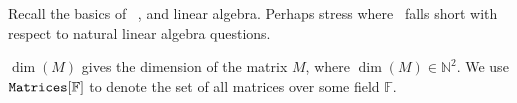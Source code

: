 Recall the basics of \lang\ \cite{matlang}, and linear algebra. Perhaps stress where \lang\ falls short with respect to natural linear algebra questions.

\bigskip

$\dim(M)$ gives the dimension of the matrix $M$, where $\dim(M)\in \mathbb{N}^2$. We use $\texttt{Matrices}[\mathbb{F}]$ to denote the set of all matrices over some field $\mathbb{F}$.

\bigskip

%
%
%
